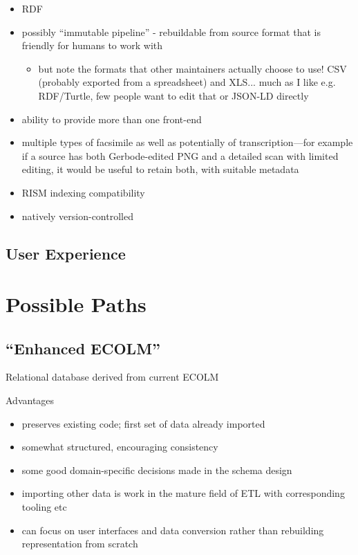 \documentclass[sigconf]{acmart}
\begin{document}
\begin{sloppypar}
  \begin{itemize}
  \item RDF
  \item possibly ``immutable pipeline'' - rebuildable from source
    format that is friendly for humans to work with
    \begin{itemize}
      \item but note the formats that other maintainers actually choose to
        use! CSV (probably exported from a spreadsheet) and
        XLS... much as I like e.g. RDF/Turtle, few people want to edit
        that or JSON-LD directly
    \end{itemize}
  \item ability to provide more than one front-end
  \item multiple types of facsimile as well as potentially of
    transcription---for example if a source has both Gerbode-edited
    PNG and a detailed scan with limited editing, it would be useful
    to retain both, with suitable metadata
  \item RISM indexing compatibility
  \item natively version-controlled
  \end{itemize}

  
  \subsection{User Experience}

  \section{Possible Paths}

  \subsection{``Enhanced ECOLM''}

  Relational database derived from current ECOLM

  Advantages

  \begin{itemize}
  \item preserves existing code; first set of data already imported
  \item somewhat structured, encouraging consistency
  \item some good domain-specific decisions made in the schema design
  \item importing other data is work in the mature field of ETL with
    corresponding tooling etc
  \item can focus on user interfaces and data conversion rather than
    rebuilding representation from scratch
  \end{itemize}


\end{sloppypar}
\end{document}
